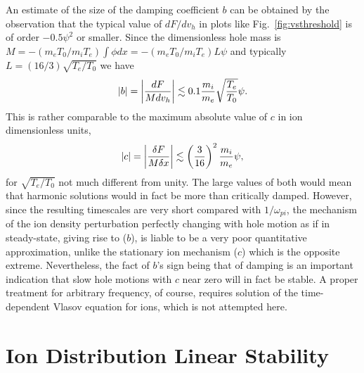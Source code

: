 \documentclass[pre]{revtex4-2}
\begin{document}
An estimate of the size of the damping coefficient $b$ can be obtained
by the observation that the typical value of $dF/dv_h$ in plots like
Fig.\ \ref{fig:vsthreshold} is of order $-0.5\psi^2$ or smaller. Since
the dimensionless hole mass is
$M=-(m_eT_0/m_iT_e)\int \phi dx=-(m_eT_0/m_iT_e)L\psi$ and typically
$L=(16/3)\sqrt{T_e/T_0}$ we have
\begin{equation}
  \label{eq:bcoef}
  |b|=\left|dF\over M dv_h\right| \lesssim 0.1{m_i\over m_e}\sqrt{T_e\over T_0}\psi.
\end{equation}
This is rather comparable to the maximum absolute value of $c$ in ion
dimensionless units,
\begin{equation}
  \label{eq:ccoef}
  |c|=\left|\delta F\over M \delta x\right| \lesssim \left(3\over
    16\right)^2{m_i\over m_e} \psi,
\end{equation}
for $\sqrt{T_e/T_0}$ not much different from unity. The large values
of both would mean that harmonic solutions would in fact be more than
critically damped. However, since the resulting timescales are very
short compared with $1/\omega_{pi}$, the mechanism of the ion density
perturbation perfectly changing with hole motion as if in
steady-state, giving rise to ($b$), is liable to be a very poor
quantitative approximation, unlike the stationary ion mechanism ($c$)
which is the opposite extreme. Nevertheless, the fact of $b$'s sign
being that of damping is an important indication that slow hole
motions with $c$ near zero will in fact be stable. A proper treatment
for arbitrary frequency, of course, requires solution of the
time-dependent Vlasov equation for ions, which is not attempted here.

\section{Ion Distribution Linear Stability}\label{sec3}
\end{document}
